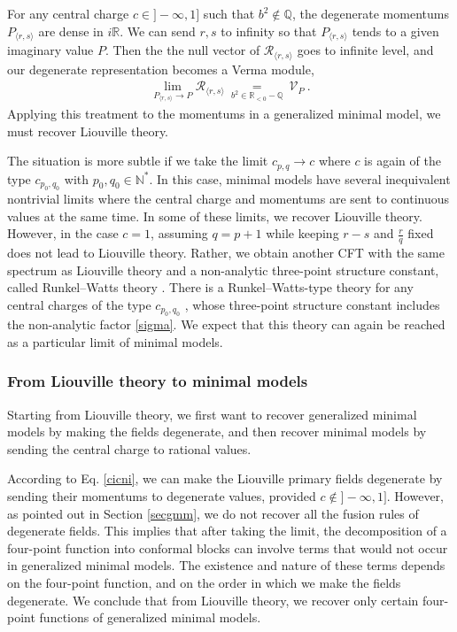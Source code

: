\documentclass[12pt, a4paper, notitlepage, twoside]{report}
\numberwithin{equation}{section}
\theoremstyle{break}
\begin{document}
For any central charge $c\in ]-\infty,1]$ such that $b^2\notin \mathbb{Q}$, the degenerate momentums $P_{\langle r,s\rangle}$ are dense in $i\mathbb{R}$. 
We can send $r,s$ to infinity so that $P_{\langle r,s\rangle}$ tends to a given imaginary value $P$. Then the the null vector of $\mathcal{R}_{\langle r,s\rangle}$ goes to infinite level, and our degenerate representation becomes a Verma module,
\begin{align}
 \lim_{P_{\langle r,s\rangle} \to P} \mathcal{R}_{\langle r,s\rangle} 
 \ \underset{b^2\in \mathbb{R}_{<0}-\mathbb{Q}}{=} \
 \mathcal{V}_{P}\ .
\end{align}
Applying this treatment to the momentums in a generalized minimal model, we must recover Liouville theory.

The situation is more subtle if we take the limit $c_{p,q}\to c$ where  $c$ is again of the type $c_{p_0,q_0}$ with $p_0,q_0\in \mathbb{N}^*$. In this case, minimal models have several inequivalent nontrivial limits where the central charge and momentums are sent to continuous values at the same time. In some of these limits, we recover Liouville theory. However, in the case $c=1$, assuming $q=p+1$ while keeping $r-s$ and $\frac{r}{q}$ fixed 
does not lead to Liouville theory. Rather, we obtain another CFT with the same spectrum as Liouville theory and a non-analytic three-point structure constant, called Runkel--Watts theory \cite{rw01}. There is a Runkel--Watts-type theory for any central charges of the type $c_{p_0,q_0}$ \cite {rs15}, whose three-point structure constant includes the non-analytic factor \eqref{sigma}.
We expect that this theory can again be reached as a particular limit of minimal models.


\subsubsection{From Liouville theory to minimal models}

Starting from Liouville theory, we first want to recover generalized minimal models by making the fields degenerate, and then recover minimal models by sending the central charge to rational values. 

According to Eq. \eqref{cicni}, we can make the Liouville primary fields degenerate by sending their momentums to degenerate values, provided $c\notin ]-\infty, 1]$. However, as pointed out in Section \ref{secgmm}, we do not recover all the fusion rules of degenerate fields. This implies that after taking the limit, the decomposition of a four-point function into conformal blocks can involve terms that would not occur in generalized minimal models. The existence and nature of these terms depends on the four-point function, and on the order in which we make the fields degenerate. We conclude that from Liouville theory, we recover only certain four-point functions of generalized minimal models. 
\end{document}
